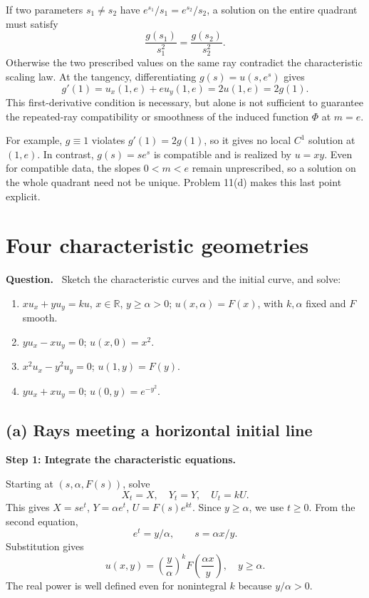 \documentclass[11pt,a4paper]{article}
\newcommand{\R}{\mathbb R}
\newcommand{\step}[1]{\par\medskip\textbf{#1}\par}
\newenvironment{question}{\par\smallskip\begingroup\color{ink}\textbf{Question.}\ }{\par\endgroup\medskip}
\newcommand{\answer}[1]{\begin{equation*}\boxed{\displaystyle #1}\end{equation*}}
\newcommand{\problem}[1]{\clearpage\section{#1}}
\begin{document}
If two parameters $s_1\ne s_2$ have $e^{s_1}/s_1=e^{s_2}/s_2$, a solution on the entire quadrant must satisfy
\[
 \frac{g(s_1)}{s_1^2}=\frac{g(s_2)}{s_2^2}.
\]
Otherwise the two prescribed values on the same ray contradict the characteristic scaling law. At the tangency, differentiating $g(s)=u(s,e^s)$ gives
\[
 g'(1)=u_x(1,e)+eu_y(1,e)=2u(1,e)=2g(1).
\]
This first-derivative condition is necessary, but alone is not sufficient to guarantee the repeated-ray compatibility or smoothness of the induced function $\Phi$ at $m=e$.

For example, $g\equiv1$ violates $g'(1)=2g(1)$, so it gives no local $C^1$ solution at $(1,e)$. In contrast, $g(s)=se^s$ is compatible and is realized by $u=xy$. Even for compatible data, the slopes $0<m<e$ remain unprescribed, so a solution on the whole quadrant need not be unique. Problem 11(d) makes this last point explicit.

\problem{Four characteristic geometries}
\begin{question}
Sketch the characteristic curves and the initial curve, and solve:
\begin{enumerate}[label=(\alph*)]
\item $xu_x+yu_y=ku$, $x\in\R$, $y\ge\alpha>0$; $u(x,\alpha)=F(x)$, with $k,\alpha$ fixed and $F$ smooth.
\item $yu_x-xu_y=0$; $u(x,0)=x^2$.
\item $x^2u_x-y^2u_y=0$; $u(1,y)=F(y)$.
\item $yu_x+xu_y=0$; $u(0,y)=e^{-y^2}$.
\end{enumerate}
\end{question}
\subsection*{(a) Rays meeting a horizontal initial line}
\step{Step 1: Integrate the characteristic equations.}
Starting at $(s,\alpha,F(s))$, solve
\[
 X_t=X,\quad Y_t=Y,\quad U_t=kU.
\]
This gives $X=se^t$, $Y=\alpha e^t$, $U=F(s)e^{kt}$. Since $y\ge\alpha$, we use $t\ge0$. From the second equation,
\[
 e^t=y/\alpha,\qquad s=\alpha x/y.
\]
Substitution gives
\answer{u(x,y)=\left(\frac y\alpha\right)^k F\!\left(\frac{\alpha x}{y}\right),\quad y\ge\alpha.}
The real power is well defined even for nonintegral $k$ because $y/\alpha>0$.
\end{document}
